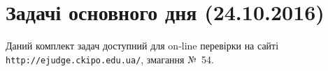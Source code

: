 ﻿\documentclass[11pt,a5paper]{extarticle}
\begin{document}
\def\myhrulefill{\vspace{12mm}\par\vspace*{-12mm}\par\hrulefill}


\tableofcontents





\section{Задачі основного дня (24.10.2016)}

Даний комплект задач доступний для on-line перевірки 
на сайті \verb"http://ejudge.ckipo.edu.ua/", змагання №~54.

\def\stdinOrInputTxt{\begin{scriptsize}stdin.txt або клавіатура (ст. вхід)\end{scriptsize}}

\def\stdoutOrOutputTxt{\begin{scriptsize}stdout.txt або екран (ст. вихід)\end{scriptsize}}


\newenvironment{problemAllDefault}[1]{\vspace{10mm}\par\begin{problem}{#1}{\stdinOrInputTxt}{\stdoutOrOutputTxt}{1 сек}{256 мегабайтів}}{\end{problem}}





\closegraphsfile
\end{document}
